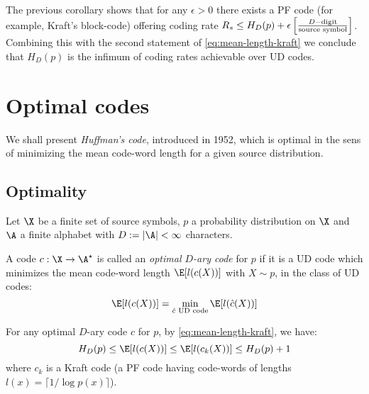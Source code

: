 \documentclass[toc]{../cs-classes/cs-classes}
\begin{document}
\begin{remark}
    The previous corollary shows that for any $\epsilon>0$ there exists a PF code (for example, Kraft's block-code) offering coding rate $R_s\leq H_D(p)+\epsilon \left[\frac{D-\textnormal{digit}}{\textnormal{source symbol}}\right]$. Combining this with the second statement of \eqref{eq:mean-length-kraft} we conclude that $H_D(p)$ is the infimum of coding rates achievable over UD codes.
\end{remark}

\section{Optimal codes}
We shall present \emph{Huffman's code}, introduced in 1952, which is optimal in the sens of minimizing the mean code-word length for a given source distribution.

\subsection{Optimality}
Let $\X$ be a finite set of source symbols, $p$ a probability distribution on $\X$ and $\A$ a finite alphabet with $D:=|\A|<\infty$ characters.

\begin{definition}
    A code $c:\X\to\A^\star$ is called an \emph{optimal $D$-ary code} for $p$ if it is a UD code which minimizes the mean code-word length $\E[l(c(X))]$ with $X\sim p$, in the class of UD codes:
    \begin{equation*}
        \E[l(c(X))] = \min_{\hat{c} \textnormal{ UD code}} \E[l(\hat{c}(X))]
    \end{equation*}
\end{definition}

\begin{remark}
    For any optimal $D$-ary code $c$ for $p$, by \ref{eq:mean-length-kraft}, we have:
    \begin{equation*}
        \label{eq:optimal-code-bound}
        H_D(p)\leq\E[l(c(X))]\leq\E[l(c_k(X))]\leq H_D(p) + 1
    \end{equation*}
    where $c_k$ is a Kraft code (a PF code having code-words of lengths $l(x)=\lceil1/\log p(x)\rceil$).
\end{remark}
\end{document}
